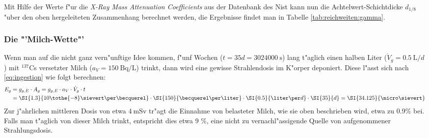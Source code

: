 \documentclass[12pt]{article}
\begin{document}
Mit Hilfe der Werte f"ur die \textit{X-Ray Mass Attenuation Coefficients} aus der Datenbank des Nist \cite{NIST} kann nun die Achtelwert-Schichtdicke $d_{1/8}$ "uber den oben hergeleiteten Zusammenhang berechnet werden, die Ergebnisse findet man in Tabelle \ref{tab:reichweiten:gamma}.
\begin{table}[h!]
	\centering
	\caption{Reichweiten von $\gamma$-Strahlung mit $E_{kin}=\SI{1.5}{\mega\electronvolt}$ in verschiedener Materie. *F"ur Luft wurde die Dichte auf H"ohe des Meeresspiegels und f"ur $\SI{20}{\degreeCelsius}$ angegeben. **F"ur Normalbeton wurde eine Dichte zwischen $\SI{2.0}{\gram\per\centi\meter\squared}$ und $\SI{2.6}{\gram\per\centi\meter\squared}$ abgesch"atzt.}
	\label{tab:reichweiten:gamma}%
\end{table}%

\subsubsection{Die "'Milch-Wette"'}
Wenn man auf die nicht ganz vern"unftige Idee kommen, f"unf Wochen ($t=35d=\SI{3024000}{\second}$) lang t"aglich einen halben Liter ($\dot{V}_g=\SI{0.5}{\liter\per d}$) mit $^{137}$Cs versetzter Milch ($a_{V}=\SI{150}{\becquerel\per\liter}$) trinkt, dann wird eine gewisse Strahlendosis im K"orper deponiert. Diese l"asst sich nach \eqref{eq:ingestion} wie folgt berechnen:
\begin{align*}
E_g&=g_{g,E}\cdot A_g=g_{g,E}\cdot a_V\cdot \dot{V}_g \cdot t\\
&=\SI{1.3}{10\tothe{-8}\sievert\per\becquerel}\cdot\SI{150}{\becquerel\per\liter}\cdot\SI{0.5}{\liter\per d}\cdot\SI{35}{d}=\SI{34.125}{\micro\sievert}
\end{align*} 
Zur j"ahrlichen mittleren Dosis von etwa $\SI{4}{\milli\sievert}$ tr"agt die Einnahme von belasteter Milch, wie sie oben beschrieben wird, etwa zu 0.9\% bei. Falls man t"aglich von dieser Milch trinkt, entspricht dies etwa 9 \%, eine nicht zu vernachl"assigende Quelle von aufgenommener Strahlungsdosis. 
\end{document}
